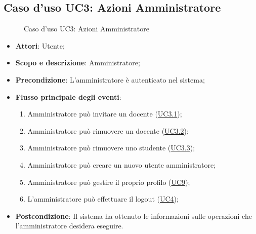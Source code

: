 \documentclass[12pt,a4paper]{article}
\begin{document}
\subsection{Caso d'uso UC3: Azioni Amministratore}
\begin{figure}[H]
	\centering

	\caption{Caso d'uso UC3: Azioni Amministratore}\label{fig:UC3} 
\end{figure}\begin{itemize}
\item \textbf{Attori}: Utente;
\item \textbf{Scopo e descrizione}: Amministratore; 
\item \textbf{Precondizione}: L'amministratore è autenticato nel sistema;

\item \textbf{Flusso principale degli eventi}:
\begin{enumerate}
	\item Amministratore può  invitare un docente (\hyperlink{UC3.1}{UC3.1});
	\item Amministratore può rimuovere un docente (\hyperlink{UC3.2}{UC3.2});
	\item Amministratore può rimuovere uno studente (\hyperlink{UC3.3}{UC3.3});
	\item Amministratore può creare un nuovo utente amministratore;
	\item Amministratore può gestire il proprio profilo (\hyperlink{UC9}{UC9});
	\item L'amministratore può effettuare il logout (\hyperlink{UC4}{UC4});
	
\end{enumerate}
\item \textbf{Postcondizione}: Il sistema ha ottenuto le informazioni sulle operazioni che
l’amministratore desidera eseguire.
\end{itemize}
\hypertarget{UC3.1}{}
\end{document}
